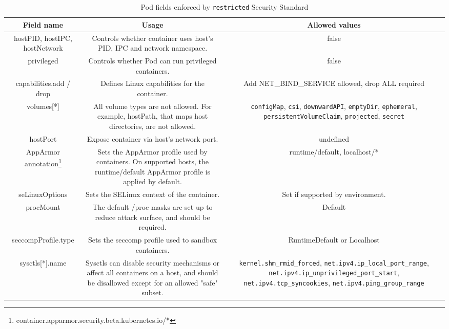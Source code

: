 \documentclass[english, 12pt, a4paper, sci, utf8, a-2b, online]{aaltothesis}
\begin{document}
\begin{table}[H]
  \centering
  \caption{Pod fields enforced by \texttt{restricted} Security Standard}
  \label{table:pod-hardening}
  \sffamily%
  \small
  \begin{minipage}{\textwidth}
  \renewcommand{\thempfootnote}{\arabic{mpfootnote}} %
  \begin{tabularx}{\textwidth}{CCC}
    \hline
    \textbf{Field name} & \textbf{Usage} & \textbf{Allowed values}\\ \hline
    hostPID, hostIPC, hostNetwork & Controls whether container uses host's PID, IPC and network namespace. & false \\ \hline
    privileged & Controls whether Pod can run privileged containers. & false \\ \hline
    capabilities.add / drop & Defines Linux capabilities for the container. & Add NET\_BIND\_SERVICE allowed, drop ALL required \\ \hline
    volumes[*] & All volume types are not allowed. For example, hostPath, that maps host directories, are not allowed. & \texttt{configMap}, \texttt{csi}, \texttt{downwardAPI}, \texttt{emptyDir}, \texttt{ephemeral}, \texttt{persistentVolumeClaim}, \texttt{projected}, \texttt{secret} \\ \hline
    hostPort & Expose container via host's network port. & undefined \\ \hline
    AppArmor annotation\footnote{container.apparmor.security.beta.kubernetes.io/*} & Sets the AppArmor profile used by containers.
    On supported hosts, the runtime/default AppArmor profile is applied by default. & runtime/default, localhost/* \\ \hline
    seLinuxOptions & Sets the SELinux context of the container. & Set if supported by environment. \\ \hline
    procMount & The default /proc masks are set up to reduce attack surface, and should be required. & Default \\ \hline
    seccompProfile.type & Sets the seccomp profile used to sandbox containers. & RuntimeDefault or Localhost \\ \hline
    sysctls[*].name & Sysctls can disable security mechanisms or affect all containers on a host, and should be disallowed except for an allowed "safe" subset. & \texttt{kernel.shm\_rmid\_forced}, \texttt{net.ipv4.ip\_local\_port\_range}, \texttt{net.ipv4.ip\_unprivileged\_port\_start}, \texttt{net.ipv4.tcp\_syncookies}, \texttt{net.ipv4.ping\_group\_range} \\ \hline

\end{tabularx}
\end{minipage}
\end{table}
\end{document}
